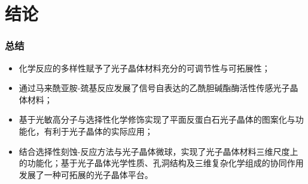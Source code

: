 \documentclass{beamer}
\begin{document}
\section{结论}
\begin{frame}
  \frametitle{总结}
  \begin{itemize}[<+-| alert@+>]
    \item
    化学反应的多样性赋予了光子晶体材料充分的可调节性与可拓展性；
    \item
    通过马来酰亚胺-巯基反应发展了信号自表达的乙酰胆碱酯酶活性传感光子晶体材料；
    \item
    基于光敏高分子与选择性化学修饰实现了平面反蛋白石光子晶体的图案化与功能化，有利于光子晶体的实际应用；
    \item
    结合选择性刻蚀-反应方法与光子晶体微球，实现了光子晶体材料三维尺度上的功能化；基于光子晶体光学性质、孔洞结构及三维复杂化学组成的协同作用发展了一种可拓展的光子晶体平台。
  \end{itemize}
\end{frame}
\end{document}
